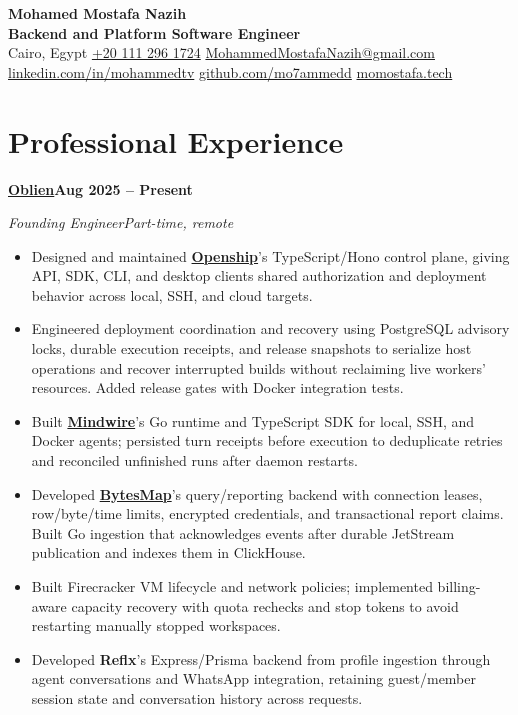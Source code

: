 \documentclass[letterpaper,11pt]{article}
\newcommand{\role}[4]{%
  \par\addvspace{9pt}%
  \Needspace{5\baselineskip}%
  \textbf{#1}\hfill\textbf{#2}\par
  \textit{#3\enspace\textbar\enspace#4}\par
}
\begin{document}
\begin{center}
  {\LARGE\textbf{Mohamed Mostafa Nazih}}\\[3pt]
  {\textbf{Backend and Platform Software Engineer}}\\[5pt]
  Cairo, Egypt\enspace\textbar\enspace
  \href{tel:+201112961724}{+20 111 296 1724}\enspace\textbar\enspace
  \href{mailto:MohammedMostafaNazih@gmail.com}{MohammedMostafaNazih@gmail.com}\\[3pt]
  {\small
    \href{https://linkedin.com/in/mohammedtv}{linkedin.com/in/mohammedtv}\enspace\textbar\enspace
    \href{https://github.com/mo7ammedd}{github.com/mo7ammedd}\enspace\textbar\enspace
    \href{https://www.momostafa.tech}{momostafa.tech}
  }
\end{center}

\section{Professional Experience}

\role{\href{https://oblien.com/}{Oblien}}{Aug 2025 -- Present}
  {Founding Engineer}{Part-time, remote}
\begin{itemize}
  \item Designed and maintained \href{https://openship.io/}{\textbf{Openship}}'s TypeScript/Hono control plane, giving API, SDK, CLI, and desktop clients shared authorization and deployment behavior across local, SSH, and cloud targets.
  \item Engineered deployment coordination and recovery using PostgreSQL advisory locks, durable execution receipts, and release snapshots to serialize host operations and recover interrupted builds without reclaiming live workers' resources. Added release gates with Docker integration tests.
  \item Built \href{https://mindwire.sh}{\textbf{Mindwire}}'s Go runtime and TypeScript SDK for local, SSH, and Docker agents; persisted turn receipts before execution to deduplicate retries and reconciled unfinished runs after daemon restarts.
  \item Developed \href{https://bytesmap.com}{\textbf{BytesMap}}'s query/reporting backend with connection leases, row/byte/time limits, encrypted credentials, and transactional report claims. Built Go ingestion that acknowledges events after durable JetStream publication and indexes them in ClickHouse.
  \item Built Firecracker VM lifecycle and network policies; implemented billing-aware capacity recovery with quota rechecks and stop tokens to avoid restarting manually stopped workspaces.
  \item Developed \textbf{Reflx}'s Express/Prisma backend from profile ingestion through agent conversations and WhatsApp integration, retaining guest/member session state and conversation history across requests.
\end{itemize}
\end{document}
